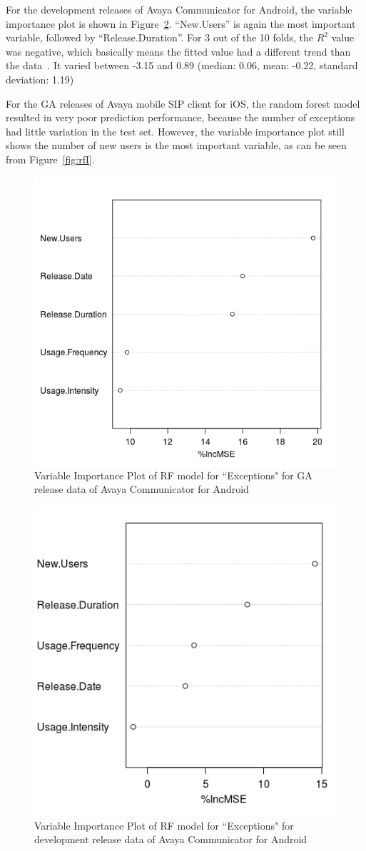 \documentclass[smallextended]{svjour3}       %
\begin{document}
For the development releases of Avaya Communicator for Android, the variable importance plot is shown in Figure~\ref{fig:rfAD}. ``New.Users'' is again the most important variable, followed by ``Release.Duration''. 
For 3 out of the 10 folds, the $R^2$ value was negative, which basically means the fitted value had a different trend than the data~\cite{negRsq}. It varied between -3.15 and 0.89 (median: 0.06, mean: -0.22, standard deviation: 1.19)

For the GA releases of Avaya mobile SIP client for iOS, the random forest model resulted in very poor prediction performance, because the number of exceptions had little variation in the test set. However, the 
variable importance plot still shows the number of new users is the most important variable, as can be seen from Figure~\ref{fig:rfI}.

\begin{figure}[!t]
\centering
\includegraphics[width=0.4\linewidth]{rfAGA}%
\caption{Variable Importance Plot of RF model for ``Exceptions" for GA release data of Avaya Communicator for Android}
\label{fig:rfAGA}
\end{figure}

\begin{figure}[!t]
\centering
\includegraphics[width=0.4\linewidth]{rfAD}%
\caption{Variable Importance Plot of RF model for ``Exceptions" for development release data of Avaya Communicator for Android}
\label{fig:rfAD}
\end{figure}
\end{document}
